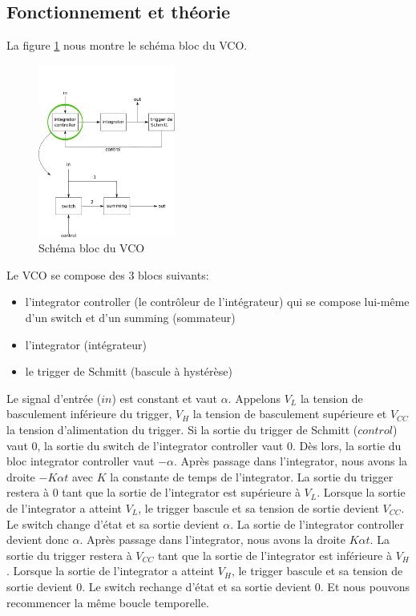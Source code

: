
\subsection{Fonctionnement et théorie}
La figure \ref{fig:schema_bloc_vco} nous montre le schéma bloc du VCO.
\begin{figure}[ht]
	\centering
	\includegraphics[width=0.4\textwidth]{img-vco/schema_bloc_vco.png}
	\caption{Schéma bloc du VCO}
	\label{fig:schema_bloc_vco}
\end{figure}
Le VCO se compose des 3 blocs suivants:
\begin{itemize}
\item l'integrator controller (le contrôleur de l'intégrateur) qui se compose lui-même d'un switch et d'un summing (sommateur)
\item l'integrator (intégrateur)
\item le trigger de Schmitt (bascule à hystérèse)
\end{itemize}

Le signal d'entrée ($in$) est constant et vaut $\alpha$. Appelons $V_L$ la tension de basculement inférieure du trigger, $V_H$ la tension de basculement supérieure et $V_{CC}$ la tension d'alimentation du trigger.
Si la sortie du trigger de Schmitt ($control$) vaut $0$, la sortie du switch de l'integrator controller vaut $0$. Dès lors, la sortie du bloc integrator controller vaut $-\alpha$.  Après passage dans l'integrator, nous avons la droite $-K\alpha t$ avec $K$ la constante de temps de l'integrator. La sortie du trigger restera à $0$ tant que la sortie de l'integrator est supérieure à $V_L$. Lorsque la sortie de l'integrator a atteint $V_L$, le trigger bascule et sa tension de sortie devient $V_{CC}$. Le switch change d'état et sa sortie devient $\alpha$. La sortie de l'integrator controller devient donc $\alpha$. Après passage dans l'integrator, nous avons la droite $K\alpha t$. La sortie du trigger restera à $V_{CC}$ tant que la sortie de l'integrator est inférieure à $V_H$. Lorsque la sortie de l'integrator a atteint $V_H$, le trigger bascule et sa tension de sortie devient $0$. Le switch rechange d'état et sa sortie devient $0$. Et nous pouvons recommencer la même boucle temporelle.

